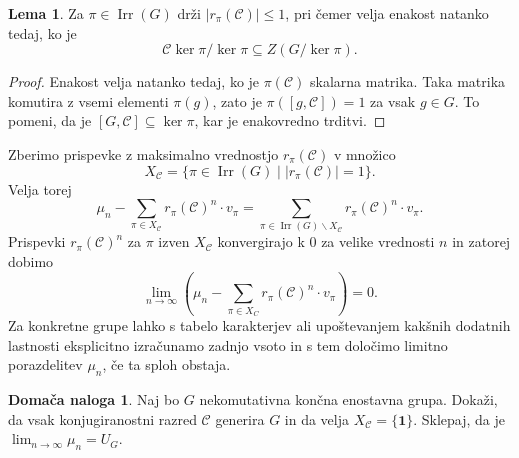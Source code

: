 \documentclass[11pt]{book}
\def\conclass{\mathcal{C}}
\def\11{\mathbf{1}}
\DeclareMathOperator\Irr{Irr}
\theoremstyle{definition}
\theoremstyle{zgled}
\theoremstyle{odprtproblem}
\theoremstyle{domacanaloga}
\newtheorem*{domacanaloga}{Domača naloga}
\newenvironment{dokaz}
    {\color{siva}\begin{proof}}
    {\end{proof}}
\theoremstyle{izrek}
\newtheorem*{lema}{Lema}
\begin{document}
\begin{lema}
Za $\pi \in \Irr(G)$ drži $|r_{\pi}(\conclass)| \leq 1$, pri čemer velja enakost natanko tedaj, ko je 
\[
    \conclass \ker \pi / \ker \pi \subseteq Z(G / \ker \pi).
\]
\end{lema}
\begin{dokaz}
Enakost velja natanko tedaj, ko je $\pi(\conclass)$ skalarna matrika. Taka matrika komutira z vsemi elementi $\pi(g)$, zato je $\pi([g, \conclass]) = 1$ za vsak $g \in G$. To pomeni, da je $[G, \conclass] \subseteq \ker \pi$, kar je enakovredno trditvi.
\end{dokaz}

Zberimo prispevke z maksimalno vrednostjo $r_{\pi}(\conclass)$ v množico
\[
    X_{\conclass} = \{ \pi \in \Irr(G) \mid |r_{\pi}(\conclass)| = 1 \}.
\]
Velja torej
\[
    \mu_n - \sum_{\pi \in X_{\conclass}} r_{\pi}(\conclass)^n \cdot v_{\pi}
    = \sum_{\pi \in \Irr(G) \backslash X_{\conclass}} r_{\pi}(\conclass)^n \cdot v_{\pi}.
\]
Prispevki $r_{\pi}(\conclass)^n$ za $\pi$ izven $X_{\conclass}$ konvergirajo k $0$ za velike vrednosti $n$ in zatorej dobimo
\[
    \lim_{n \to \infty} \left( \mu_n - \sum_{\pi \in X_C} r_{\pi}(\conclass)^n \cdot v_{\pi} \right) = 0.
\]
Za konkretne grupe lahko s tabelo karakterjev ali upoštevanjem kakšnih dodatnih lastnosti eksplicitno izračunamo zadnjo vsoto in s tem določimo limitno porazdelitev $\mu_n$, če ta sploh obstaja.

\begin{domacanaloga}
Naj bo $G$ nekomutativna končna enostavna grupa. Dokaži, da vsak konjugiranostni razred $\conclass$ generira $G$ in da velja $X_{\conclass} = \{ \11 \}$. Sklepaj, da je $\lim_{n \to \infty} \mu_n = U_G$.
\end{domacanaloga}
\end{document}
